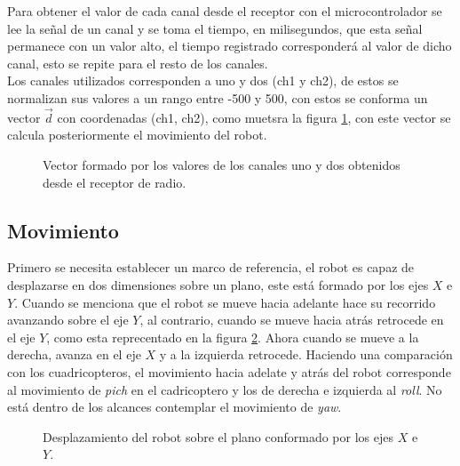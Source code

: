 \documentclass{iccmemoria}
\begin{document}
Para obtener el valor de cada canal desde el receptor con el microcontrolador se lee la señal de un canal y se toma el tiempo, en milisegundos, que esta señal permanece con un valor alto, el tiempo registrado corresponderá al valor de dicho canal, esto se repite para el resto de los canales.\\
 
Los canales utilizados corresponden a uno y dos (ch1 y ch2), de estos se normalizan sus valores a un rango entre -500 y 500, con estos se conforma un vector $\vec{d}$ con coordenadas (ch1, ch2), como muetsra la figura \ref{fig:radio_values}, con este vector se calcula posteriormente el movimiento del robot.\\

\begin{figure}[H]
  \centering
  \selectfont{
  
  }
  \caption{Vector formado por los valores de los canales uno y dos obtenidos desde el receptor de radio.}
  \label{fig:radio_values}
\end{figure}

\subsection{Movimiento}

Primero se necesita establecer un marco de referencia, el robot es capaz de desplazarse en dos dimensiones sobre un plano, este está formado por los ejes $X$ e $Y$. Cuando se menciona que el robot se mueve hacia adelante hace su recorrido avanzando sobre el eje $Y$, al contrario, cuando se mueve hacia atrás retrocede en el eje $Y$, como esta reprecentado en la figura \ref{fig:omni_direcition}. Ahora cuando se mueve a la derecha, avanza en el eje $X$ y a la izquierda retrocede. Haciendo una comparación con los cuadricopteros, el movimiento hacia adelate y atrás del robot corresponde al movimiento de \emph{pich} en el cadricoptero y los de derecha e izquierda al \emph{roll}. No está dentro de los alcances contemplar el movimiento de \emph{yaw}.\\

\begin{figure}[H]
  \centering
  \selectfont{
  
  }
  \caption{Desplazamiento del robot sobre el plano conformado por los ejes $X$ e $Y$.}
  \label{fig:omni_direcition}
\end{figure}
\end{document}
